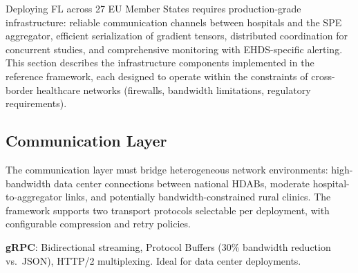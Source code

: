 \documentclass[conference]{IEEEtran}
\begin{document}
Deploying FL across 27 EU Member States requires production-grade infrastructure: reliable communication channels between hospitals and the SPE aggregator, efficient serialization of gradient tensors, distributed coordination for concurrent studies, and comprehensive monitoring with EHDS-specific alerting. This section describes the infrastructure components implemented in the reference framework, each designed to operate within the constraints of cross-border healthcare networks (firewalls, bandwidth limitations, regulatory requirements).

\subsection{Communication Layer}

The communication layer must bridge heterogeneous network environments: high-bandwidth data center connections between national HDABs, moderate hospital-to-aggregator links, and potentially bandwidth-constrained rural clinics. The framework supports two transport protocols selectable per deployment, with configurable compression and retry policies.

\begin{figure}[htbp]
\centering
{}
\end{figure}

\textbf{gRPC}: Bidirectional streaming, Protocol Buffers (30\% bandwidth reduction vs.\ JSON), HTTP/2 multiplexing. Ideal for data center deployments.
\end{document}
